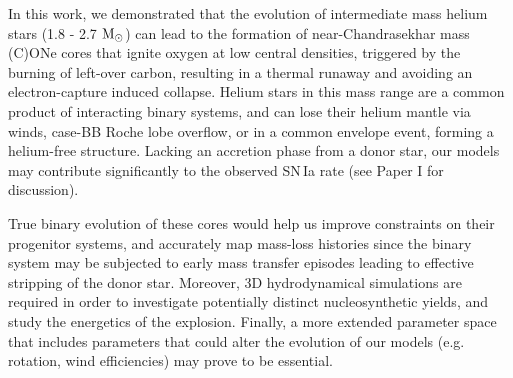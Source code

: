 \documentclass[../../main/thesis_msc.tex]{subfiles}
\begin{document}
In this work, we demonstrated that the evolution of intermediate mass helium stars (1.8 - 2.7 $\rm M_{\odot}$) can lead to the formation of near-Chandrasekhar mass (C)ONe cores that ignite oxygen at low central densities, triggered by the burning of left-over carbon, resulting in a thermal runaway and avoiding an electron-capture induced collapse. Helium stars in this mass range are a common product of interacting binary systems, and can lose their helium mantle via winds, case-BB Roche lobe overflow, or in a common envelope event, forming a helium-free structure. Lacking an accretion phase from a donor star, our models may contribute significantly to the observed SN\,Ia rate (see Paper I for discussion).

True binary evolution of these cores would help us improve constraints on their progenitor systems, and accurately map mass-loss histories since the binary system may be subjected to early mass transfer episodes leading to effective stripping of the donor star. Moreover, 3D hydrodynamical simulations are required in order to investigate potentially distinct nucleosynthetic yields, and study the energetics of the explosion. Finally, a more extended parameter space that includes parameters that could alter the evolution of our models (e.g. rotation, wind efficiencies) may prove to be essential.
\end{document}
